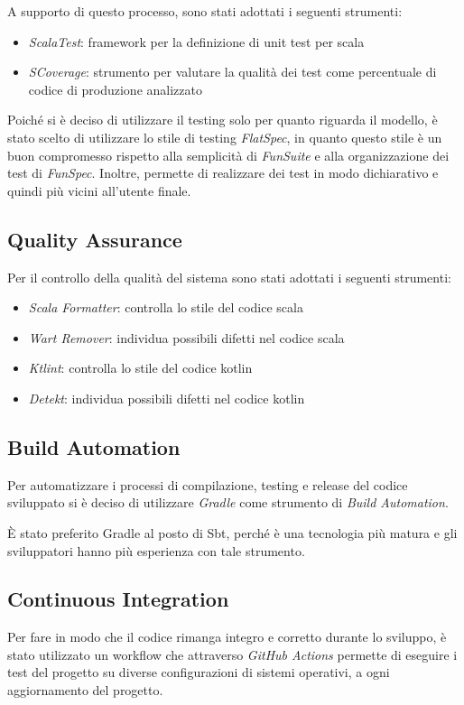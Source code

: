 A supporto di questo processo, sono stati adottati i seguenti strumenti:
\begin{itemize}
    \item \textit{ScalaTest}: framework per la definizione di unit test per scala
    \item \textit{SCoverage}: strumento per valutare la qualità dei test come percentuale di codice di produzione analizzato
\end{itemize}

Poiché si è deciso di utilizzare il testing solo per quanto riguarda il modello, è stato scelto di utilizzare lo stile
di testing \textit{FlatSpec}, in quanto questo stile è un buon compromesso rispetto alla semplicità di \textit{FunSuite} e
alla organizzazione dei test di \textit{FunSpec}. Inoltre, permette di realizzare dei test in modo dichiarativo e quindi più
vicini all'utente finale.

\subsection{Quality Assurance}
Per il controllo della qualità del sistema sono stati adottati i seguenti strumenti:
\begin{itemize}
    \item \textit{Scala Formatter}: controlla lo stile del codice scala
    \item \textit{Wart Remover}: individua possibili difetti nel codice scala
    \item \textit{Ktlint}: controlla lo stile del codice kotlin
    \item \textit{Detekt}: individua possibili difetti nel codice kotlin
\end{itemize}

\subsection{Build Automation}
Per automatizzare i processi di compilazione, testing e release del codice sviluppato si è deciso di utilizzare \textit{Gradle}
come strumento di \textit{Build Automation}.

È stato preferito Gradle al posto di Sbt, perché è una tecnologia più matura e gli sviluppatori hanno più esperienza
con tale strumento.

\subsection{Continuous Integration}
Per fare in modo che il codice rimanga integro e corretto durante lo sviluppo, è stato utilizzato un workflow che
attraverso \textit{GitHub Actions} permette di eseguire i test del progetto su diverse configurazioni di sistemi operativi,
a ogni aggiornamento del progetto.

